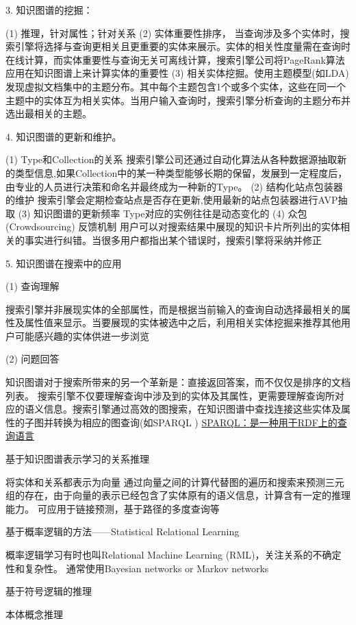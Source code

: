 3. 知识图谱的挖掘：

(1) 推理，针对属性；针对关系
(2) 实体重要性排序，
当查询涉及多个实体时，搜索引擎将选择与查询更相关且更重要的实体来展示。实体的相关性度量需在查询时在线计算，而实体重要性与查询无关可离线计算，搜索引擎公司将PageRank算法 应用在知识图谱上来计算实体的重要性
(3) 相关实体挖掘。使用主题模型(如LDA) 发现虚拟文档集中的主题分布。其中每个主题包含1个或多个实体，这些在同一个主题中的实体互为相关实体。当用户输入查询时，搜索引擎分析查询的主题分布并选出最相关的主题。

4. 知识图谱的更新和维护。

(1) Type和Collection的关系
搜索引擎公司还通过自动化算法从各种数据源抽取新的类型信息,如果Collection中的某一种类型能够长期的保留，发展到一定程度后，由专业的人员进行决策和命名并最终成为一种新的Type。
(2) 结构化站点包装器的维护
搜索引擎会定期检查站点是否存在更新,使用最新的站点包装器进行AVP抽取
(3) 知识图谱的更新频率
Type对应的实例往往是动态变化的
(4) 众包(Crowdsourcing) 反馈机制
用户可以对搜索结果中展现的知识卡片所列出的实体相关的事实进行纠错。当很多用户都指出某个错误时，搜索引擎将采纳并修正

5. 知识图谱在搜索中的应用

(1) 查询理解

搜索引擎并非展现实体的全部属性，而是根据当前输入的查询自动选择最相关的属性及属性值来显示。当要展现的实体被选中之后，利用相关实体挖掘来推荐其他用户可能感兴趣的实体供进一步浏览

(2)  问题回答

知识图谱对于搜索所带来的另一个革新是：直接返回答案，而不仅仅是排序的文档列表。
搜索引擎不仅要理解查询中涉及到的实体及其属性，更需要理解查询所对应的语义信息。搜索引擎通过高效的图搜索，在知识图谱中查找连接这些实体及属性的子图并转换为相应的图查询(如SPARQL )
\href{https://www.w3.org/TR/rdf-sparql-query/}{SPARQL：是一种用于RDF上的查询语言}

基于知识图谱表示学习的关系推理

    将实体和关系都表示为向量
    通过向量之间的计算代替图的遍历和搜索来预测三元组的存在，由于向量的表示已经包含了实体原有的语义信息，计算含有⼀定的推理能⼒。
    可应⽤于链接预测，基于路径的多度查询等

基于概率逻辑的⽅法——Statistical Relational Learning

概率逻辑学习有时也叫Relational Machine Learning (RML)，关注关系的不确定性和复杂性。
通常使用Bayesian networks or Markov networks

基于符号逻辑的推理

本体概念推理

